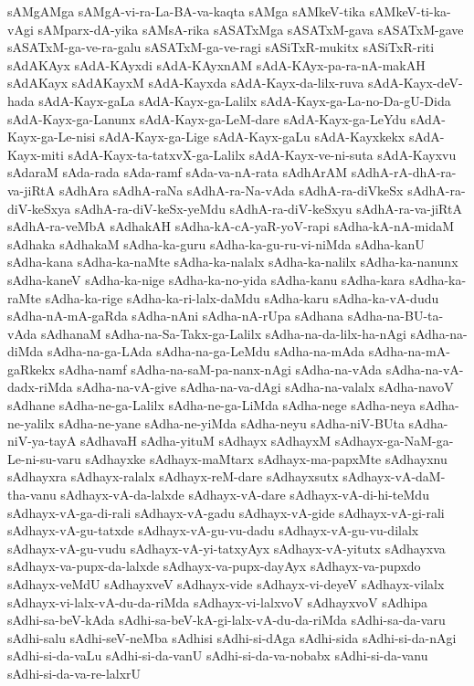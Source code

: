 {sAMgAMga
sAMgA-vi-ra-La-BA-va-kaqta
sAMga
sAMkeV-tika
sAMkeV-ti-ka-vAgi
sAMparx-dA-yika
sAMsA-rika
sASATxMga
sASATxM-gava
sASATxM-gave
sASATxM-ga-ve-ra-galu
sASATxM-ga-ve-ragi
sASiTxR-mukitx
sASiTxR-riti
sAdAKAyx
sAdA-KAyxdi
sAdA-KAyxnAM
sAdA-KAyx-pa-ra-nA-makAH
sAdAKayx
sAdAKayxM
sAdA-Kayxda
sAdA-Kayx-da-lilx-ruva
sAdA-Kayx-deV-hada
sAdA-Kayx-gaLa
sAdA-Kayx-ga-Lalilx
sAdA-Kayx-ga-La-no-Da-gU-Dida
sAdA-Kayx-ga-Lanunx
sAdA-Kayx-ga-LeM-dare
sAdA-Kayx-ga-LeYdu
sAdA-Kayx-ga-Le-nisi
sAdA-Kayx-ga-Lige
sAdA-Kayx-gaLu
sAdA-Kayxkekx
sAdA-Kayx-miti
sAdA-Kayx-ta-tatxvX-ga-Lalilx
sAdA-Kayx-ve-ni-suta
sAdA-Kayxvu
sAdaraM
sAda-rada
sAda-ramf
sAda-va-nA-rata
sAdhArAM
sAdhA-rA-dhA-ra-va-jiRtA
sAdhAra
sAdhA-raNa
sAdhA-ra-Na-vAda
sAdhA-ra-diVkeSx
sAdhA-ra-diV-keSxya
sAdhA-ra-diV-keSx-yeMdu
sAdhA-ra-diV-keSxyu
sAdhA-ra-va-jiRtA
sAdhA-ra-veMbA
sAdhakAH
sAdha-kA-cA-yaR-yoV-rapi
sAdha-kA-nA-midaM
sAdhaka
sAdhakaM
sAdha-ka-guru
sAdha-ka-gu-ru-vi-niMda
sAdha-kanU
sAdha-kana
sAdha-ka-naMte
sAdha-ka-nalalx
sAdha-ka-nalilx
sAdha-ka-nanunx
sAdha-kaneV
sAdha-ka-nige
sAdha-ka-no-yida
sAdha-kanu
sAdha-kara
sAdha-ka-raMte
sAdha-ka-rige
sAdha-ka-ri-lalx-daMdu
sAdha-karu
sAdha-ka-vA-dudu
sAdha-nA-mA-gaRda
sAdha-nAni
sAdha-nA-rUpa
sAdhana
sAdha-na-BU-ta-vAda
sAdhanaM
sAdha-na-Sa-Takx-ga-Lalilx
sAdha-na-da-lilx-ha-nAgi
sAdha-na-diMda
sAdha-na-ga-LAda
sAdha-na-ga-LeMdu
sAdha-na-mAda
sAdha-na-mA-gaRkekx
sAdha-namf
sAdha-na-saM-pa-nanx-nAgi
sAdha-na-vAda
sAdha-na-vA-dadx-riMda
sAdha-na-vA-give
sAdha-na-va-dAgi
sAdha-na-valalx
sAdha-navoV
sAdhane
sAdha-ne-ga-Lalilx
sAdha-ne-ga-LiMda
sAdha-nege
sAdha-neya
sAdha-ne-yalilx
sAdha-ne-yane
sAdha-ne-yiMda
sAdha-neyu
sAdha-niV-BUta
sAdha-niV-ya-tayA
sAdhavaH
sAdha-yituM
sAdhayx
sAdhayxM
sAdhayx-ga-NaM-ga-Le-ni-su-varu
sAdhayxke
sAdhayx-maMtarx
sAdhayx-ma-papxMte
sAdhayxnu
sAdhayxra
sAdhayx-ralalx
sAdhayx-reM-dare
sAdhayxsutx
sAdhayx-vA-daM-tha-vanu
sAdhayx-vA-da-lalxde
sAdhayx-vA-dare
sAdhayx-vA-di-hi-teMdu
sAdhayx-vA-ga-di-rali
sAdhayx-vA-gadu
sAdhayx-vA-gide
sAdhayx-vA-gi-rali
sAdhayx-vA-gu-tatxde
sAdhayx-vA-gu-vu-dadu
sAdhayx-vA-gu-vu-dilalx
sAdhayx-vA-gu-vudu
sAdhayx-vA-yi-tatxyAyx
sAdhayx-vA-yitutx
sAdhayxva
sAdhayx-va-pupx-da-lalxde
sAdhayx-va-pupx-dayAyx
sAdhayx-va-pupxdo
sAdhayx-veMdU
sAdhayxveV
sAdhayx-vide
sAdhayx-vi-deyeV
sAdhayx-vilalx
sAdhayx-vi-lalx-vA-du-da-riMda
sAdhayx-vi-lalxvoV
sAdhayxvoV
sAdhipa
sAdhi-sa-beV-kAda
sAdhi-sa-beV-kA-gi-lalx-vA-du-da-riMda
sAdhi-sa-da-varu
sAdhi-salu
sAdhi-seV-neMba
sAdhisi
sAdhi-si-dAga
sAdhi-sida
sAdhi-si-da-nAgi
sAdhi-si-da-vaLu
sAdhi-si-da-vanU
sAdhi-si-da-va-nobabx
sAdhi-si-da-vanu
sAdhi-si-da-va-re-lalxrU
}
